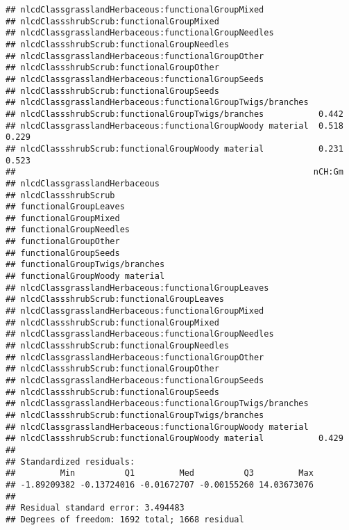 \documentclass[]{article}
\begin{document}
\begin{verbatim}
## nlcdClassgrasslandHerbaceous:functionalGroupMixed                       
## nlcdClassshrubScrub:functionalGroupMixed                                
## nlcdClassgrasslandHerbaceous:functionalGroupNeedles                     
## nlcdClassshrubScrub:functionalGroupNeedles                              
## nlcdClassgrasslandHerbaceous:functionalGroupOther                       
## nlcdClassshrubScrub:functionalGroupOther                                
## nlcdClassgrasslandHerbaceous:functionalGroupSeeds                       
## nlcdClassshrubScrub:functionalGroupSeeds                                
## nlcdClassgrasslandHerbaceous:functionalGroupTwigs/branches              
## nlcdClassshrubScrub:functionalGroupTwigs/branches           0.442       
## nlcdClassgrasslandHerbaceous:functionalGroupWoody material  0.518  0.229
## nlcdClassshrubScrub:functionalGroupWoody material           0.231  0.523
##                                                            nCH:Gm
## nlcdClassgrasslandHerbaceous                                     
## nlcdClassshrubScrub                                              
## functionalGroupLeaves                                            
## functionalGroupMixed                                             
## functionalGroupNeedles                                           
## functionalGroupOther                                             
## functionalGroupSeeds                                             
## functionalGroupTwigs/branches                                    
## functionalGroupWoody material                                    
## nlcdClassgrasslandHerbaceous:functionalGroupLeaves               
## nlcdClassshrubScrub:functionalGroupLeaves                        
## nlcdClassgrasslandHerbaceous:functionalGroupMixed                
## nlcdClassshrubScrub:functionalGroupMixed                         
## nlcdClassgrasslandHerbaceous:functionalGroupNeedles              
## nlcdClassshrubScrub:functionalGroupNeedles                       
## nlcdClassgrasslandHerbaceous:functionalGroupOther                
## nlcdClassshrubScrub:functionalGroupOther                         
## nlcdClassgrasslandHerbaceous:functionalGroupSeeds                
## nlcdClassshrubScrub:functionalGroupSeeds                         
## nlcdClassgrasslandHerbaceous:functionalGroupTwigs/branches       
## nlcdClassshrubScrub:functionalGroupTwigs/branches                
## nlcdClassgrasslandHerbaceous:functionalGroupWoody material       
## nlcdClassshrubScrub:functionalGroupWoody material           0.429
## 
## Standardized residuals:
##         Min          Q1         Med          Q3         Max 
## -1.89209382 -0.13724016 -0.01672707 -0.00155260 14.03673076 
## 
## Residual standard error: 3.494483 
## Degrees of freedom: 1692 total; 1668 residual
\end{verbatim}
\end{document}
